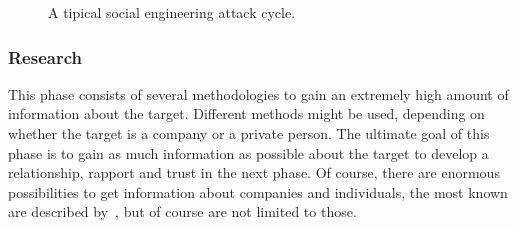 \begin{figure}
  \begin{center}

    \caption{A tipical social engineering attack cycle.}
  \end{center}
\end{figure}

\subsubsection{Research}

This phase consists of several methodologies to gain an extremely high amount of
information about the target. Different methods might be used, depending on
whether the target is a company or a private person. The ultimate goal of this
phase is to gain as much information as possible about the target to develop a
relationship, rapport and trust in the next phase. Of course, there are
enormous possibilities to get information about companies and individuals, the
most known are described by~\cite{jones2004,mitnick2003,thornburgh2004}, but of
course are not limited to those.

